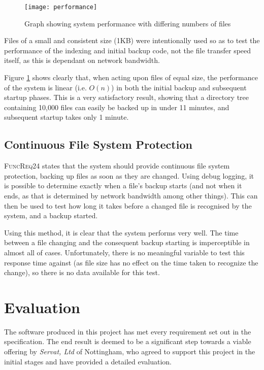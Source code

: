 \begin{figure}
    \begin{center}
        \texttt{[image: performance]}
    \end{center}
    \caption{Graph showing system performance with differing numbers of files}
    \label{fig:performance-graph}
\end{figure}

Files of a small and consistent size (1KB) were intentionally used so as to
test the performance of the indexing and initial backup code, not the file
transfer speed itself, as this is dependant on network bandwidth.

Figure \ref{fig:performance-graph} shows clearly that, when acting upon files
of equal size, the performance of the system is linear (i.e. $O(n)$) in both
the initial backup and subsequent startup phases. This is a very satisfactory
result, showing that a directory tree containing 10,000 files can easily be
backed up in under 11 minutes, and subsequent startup takes only 1 minute.

\subsection{Continuous File System Protection}

\textsc{FuncReq24} states that the system should provide continuous file system
protection, backing up files as soon as they are changed. Using debug logging,
it is possible to determine exactly when a file's backup starts (and not when
it ends, as that is determined by network bandwidth among other things). This
can then be used to test how long it takes before a changed file is recognised
by the system, and a backup started.

Using this method, it is clear that the system performs very well. The time
between a file changing and the consequent backup starting is imperceptible in
almost all of cases. Unfortunately, there is no meaningful variable to test
this response time against (as file size has no effect on the time taken to
recognize the change), so there is no data available for this test.

\section{Evaluation}

The software produced in this project has met every requirement set out in the
specification. The end result is deemed to be a significant step towards
a viable offering by \emph{Servat, Ltd} of Nottingham, who agreed to support
this project in the initial stages and have provided a detailed evaluation.


